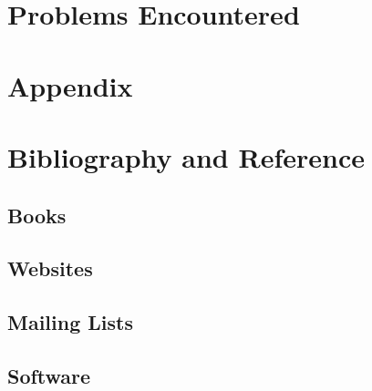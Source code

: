 \documentclass[a4paper,12pt]{article}
\begin{document}
\section{Problems Encountered}


\section{Appendix}


\section{Bibliography and Reference}


\subsection{Books}

\subsection{Websites}

\subsection{Mailing Lists}

\subsection{Software}
\end{document}
